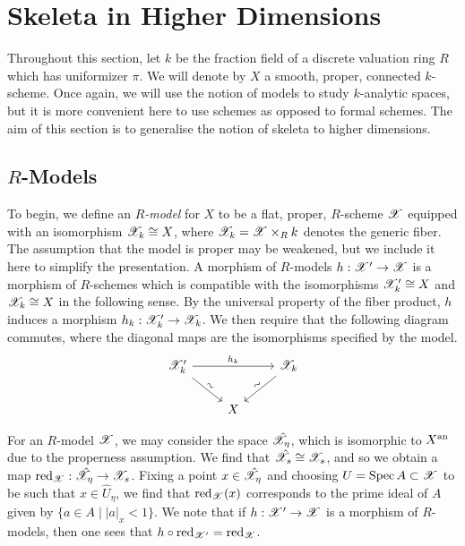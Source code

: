 
\chapter{Skeleta in Higher Dimensions} \label{chapter4}

Throughout this section, let $k$ be the fraction field of a discrete valuation ring $R$ which has uniformizer $\pi$. 
We will denote by $X$ a smooth, proper, connected $k$-scheme.
Once again, we will use the notion of models to study $k$-analytic spaces, but it is more convenient here to use schemes as opposed to formal schemes.
The aim of this section is to generalise the notion of skeleta to higher dimensions.

\section{$R$-Models}

To begin, we define an \textit{$R$-model} for $X$ to be a flat, proper, $R$-scheme $\mathscr{X}$ equipped with an isomorphism $\mathscr{X}_k \cong X$, where $\mathscr{X}_k = \mathscr{X} \times_{R} k$ denotes the generic fiber.
The assumption that the model is proper may be weakened, but we include it here to simplify the presentation.
A morphism of $R$-models $h: \mathscr{X}' \to \mathscr{X}$ is a morphism of $R$-schemes which is compatible with the isomorphisms $\mathscr{X}'_k \cong X$ and $\mathscr{X}_k \cong X$ in the following sense.
By the universal property of the fiber product, $h$ induces a morphism $h_k: \mathscr{X}'_k \to \mathscr{X}_k$.
We then require that the following diagram commutes, where the diagonal maps are the isomorphisms specified by the model.
\[
\begin{tikzcd}
        \model_k' \arrow[dr, "\sim", sloped] \arrow[rr,"h_k"] && \model_k \arrow[dl, "\sim", sloped] \\
        & X 
\end{tikzcd}    
\]

For an $R$-model $\mathscr{X}$, we may consider the space $\hat{\mathscr{X}}_{\eta}$, which is isomorphic to $X^{\text{an}}$ due to the properness assumption.
We find that $\hat{\mathscr{X}}_{s} \cong \mathscr{X}_s$, and so we obtain a map $\operatorname{red}_{\mathscr{X}} : \hat{\mathscr{X}}_{\eta} \to \mathscr{X}_s$.
Fixing a point $x \in \hat{\mathscr{X}}_{\eta}$ and choosing $U = \operatorname{Spec} A \subset \mathscr{X}$ to be such that $x \in \hat{U}_{\eta}$, we find that $\operatorname{red}_{\mathscr{X}}(x)$ corresponds to the prime ideal of $A$ given by $\{ a \in A \; \vert \; |a|_x < 1\}$.
We note that if $h: \mathscr{X}' \to \mathscr{X}$ is a morphism of $R$-models, then one sees that $h \circ \operatorname{red}_{\mathscr{X}'} = \operatorname{red}_{\mathscr{X}}$.

